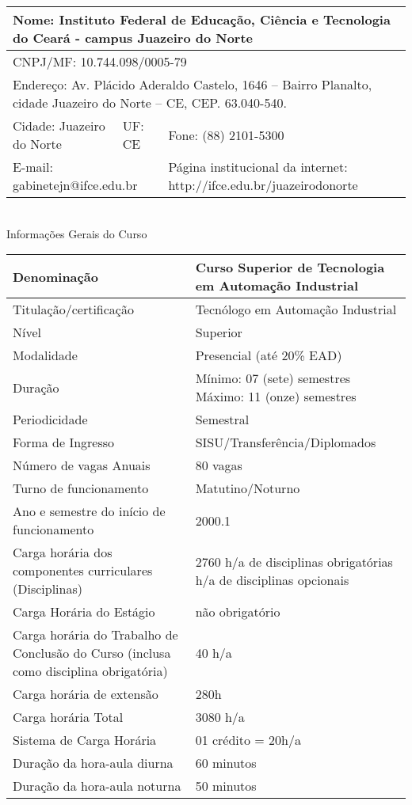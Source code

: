 \begin{tabular}{|p{5cm}|p{1.5cm}|p{5cm}|}
\hline 
\multicolumn{3}{|p{14cm}|}{Nome: Instituto Federal de Educação, Ciência e Tecnologia do Ceará - campus Juazeiro do Norte} \\ 
\hline 
\multicolumn{3}{|p{14cm}|}{CNPJ/MF: 10.744.098/0005-79} \\ 
\hline 
\multicolumn{3}{|p{14cm}|}{Endereço: Av. Plácido Aderaldo Castelo, 1646 – Bairro Planalto, cidade
Juazeiro do Norte – CE, CEP. 63.040-540.} \\ 
\hline 
Cidade: Juazeiro do Norte & UF:
CE & Fone: (88) 2101-5300 \\ 
\hline 
\multicolumn{2}{|p{6cm}|}{E-mail: gabinetejn@ifce.edu.br} & Página institucional da internet:
http://ifce.edu.br/juazeirodonorte \\ 
\hline 
\end{tabular} \\

\vspace{1cm}
Informações Gerais do Curso

\begin{tabular}{|p{6cm}|p{6cm}|}
\hline 
Denominação & Curso Superior de
Tecnologia em Automação
Industrial \\ 
\hline 
Titulação/certificação & Tecnólogo em Automação
Industrial \\ 
\hline 
Nível & Superior \\ 
\hline 
Modalidade & Presencial (até 20\% EAD) \\ 
\hline 
Duração & Mínimo: 07 (sete) semestres \newline
Máximo: 11 (onze) semestres \\ 
\hline 
Periodicidade & Semestral \\ 
\hline 
Forma de Ingresso & SISU/Transferência/Diplomados \\ 
\hline 
Número de vagas Anuais & 80 vagas \\ 
\hline 
Turno de funcionamento & Matutino/Noturno \\ 
\hline 
Ano e semestre do início de funcionamento & 2000.1 \\ 
\hline 
Carga horária dos
componentes curriculares
(Disciplinas) & 2760 h/a de
disciplinas
obrigatórias 
\newline
40 h/a de disciplinas opcionais \\ 
\hline 
Carga Horária do Estágio & não obrigatório \\ 
\hline 
Carga horária do Trabalho de Conclusão do Curso (inclusa como disciplina obrigatória)& 40 h/a \\ 
\hline
Carga horária de extensão& 280h\\
\hline 
Carga horária Total & 3080 h/a \\ 
\hline 
Sistema de Carga Horária & 01 crédito = 20h/a \\ 
\hline 
Duração da hora-aula diurna & 60 minutos \\ 
\hline 
Duração da hora-aula noturna & 50 minutos \\
\hline 
\end{tabular}


